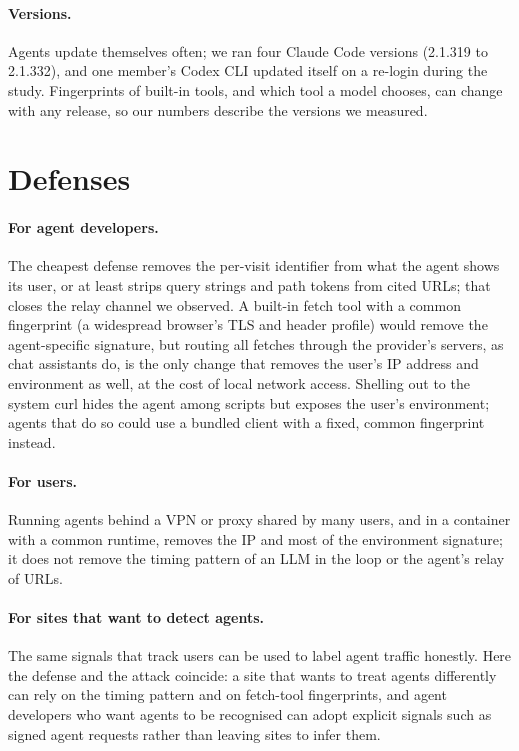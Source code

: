 \paragraph{Versions.} Agents update themselves often; we ran four Claude Code versions (2.1.319 to 2.1.332), and
one member's Codex CLI updated itself on a re-login during the study. Fingerprints of built-in tools, and which tool
a model chooses, can change with any release, so our numbers describe the versions we measured.

\section{Defenses}
\label{sec:defenses}

\paragraph{For agent developers.} The cheapest defense removes the per-visit identifier from what the
agent shows its user, or at least strips query strings and path tokens from cited URLs; that closes the
relay channel we observed. A built-in fetch tool with a common fingerprint (a widespread browser's TLS
and header profile) would remove the agent-specific signature, but routing all fetches through the
provider's servers, as chat assistants do, is the only change that removes the user's IP address and
environment as well, at the cost of local network access. Shelling out to the system curl hides the
agent among scripts but exposes the user's environment; agents that do so could use a bundled client
with a fixed, common fingerprint instead.

\paragraph{For users.} Running agents behind a VPN or proxy shared by many users, and in a container
with a common runtime, removes the IP and most of the environment signature; it does not remove the
timing pattern of an LLM in the loop or the agent's relay of URLs.

\paragraph{For sites that want to detect agents.} The same signals that track users can be used to
label agent traffic honestly. Here the defense and the attack coincide: a site that wants to treat
agents differently can rely on the timing pattern and on fetch-tool fingerprints, and agent developers
who want agents to be recognised can adopt explicit signals such as signed agent requests rather than
leaving sites to infer them.
